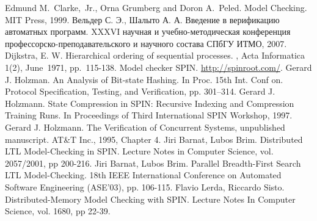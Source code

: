 \begin{thebibliography}{99}

 Edmund M.~Clarke,~Jr., Orna Grumberg and Doron A.~Peled. Model
  Checking. MIT Press, 1999.
 Вельдер С. Э., Шалыто А. А. Введение в верификацию автоматных
  программ. XXXVI научная и учебно-методическая конференция
  профессорско-преподавательского и научного состава СПбГУ ИТМО, 2007.
 Dijkstra, E. W. Hierarchical ordering of sequential processes. , Acta
  Informatica 1(2), June~1971, pp.~115-138.
 Model checker SPIN. \url{http://spinroot.com/}.
 Gerard J. Holzman. An Analysis of Bit-state
  Hashing. In Proc. 15th Int. Conf on. Protocol Specification,
  Testing, and Verification, pp. 301–314.
 Gerard J. Holzmann. State Compression in SPIN: Recursive
  Indexing and Compression Training Runs. In Proceedings of Third International
  SPIN Workshop, 1997.
 Gerard J. Holzmann. The Verification of Concurrent Systems,
  unpublished manuscript. AT\&T Inc., 1995, Chapter 4.
 Jiri Barnat, Lubos Brim. Distributed LTL
  Model-Checking in SPIN. Lecture Notes in Computer Science,
  vol. 2057/2001, pp 200-216.
 Jiri Barnat, Lubos Brim. Parallel Breadth-First Search
  LTL Model-Checking. 18th IEEE International Conference on Automated
  Software Engineering (ASE'03), pp. 106-115.
 Flavio Lerda, Riccardo Sisto. Distributed-Memory Model
  Checking with SPIN. Lecture Notes In Computer Science, vol. 1680, pp
  22-39.
\end{thebibliography}

